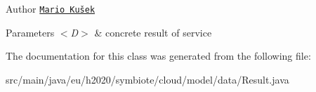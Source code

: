 \begin{DoxyAuthor}{Author}
\href{mailto:mario.kusek@fer.hr}{\tt Mario Kušek}
\end{DoxyAuthor}

\begin{DoxyParams}{Parameters}
{\em $<$\+D$>$} & concrete result of service \\
\hline
\end{DoxyParams}


The documentation for this class was generated from the following file\+:\begin{DoxyCompactItemize}
\item 
src/main/java/eu/h2020/symbiote/cloud/model/data/Result.\+java\end{DoxyCompactItemize}
